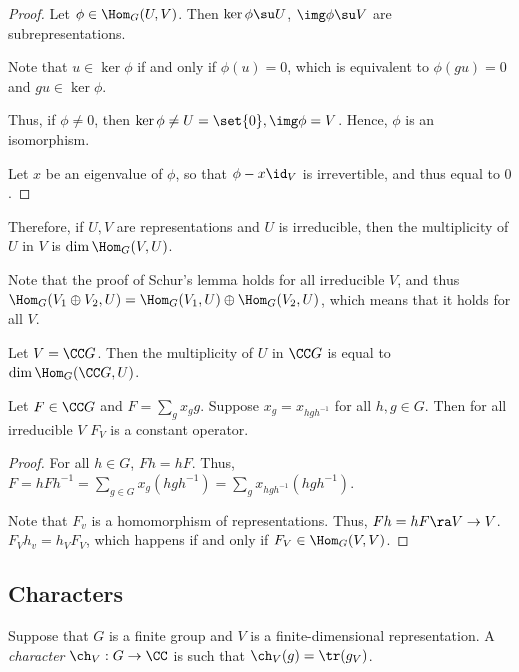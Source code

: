 \documentclass[11pt]{scrartcl}
\begin{document}
  \begin{proof}
    \hfill

    Let $\phi \in \Hom_{G}(U, V)$. Then $\ker \phi \su U$,
    $\img \phi \su V$ are subrepresentations.

    Note that $u\in\ker \phi$ if and only if $\phi(u) = 0$, which is
    equivalent to $\phi(gu) = 0$ and $gu \in \ker \phi$.

    Thus, if $\phi\neq 0$, then
    $\ker \phi \neq U = \set{0}, \img \phi = V $. Hence, $\phi$ is an
    isomorphism.

    Let $x$ be an eigenvalue of $\phi$, so that $\phi - x \id_{V}$ is
    irrevertible, and thus equal to $0$.
  \end{proof}

  Therefore, if $U, V$ are representations and $U$ is irreducible,
  then the multiplicity of $U$ in $V$ is $\dim \Hom_{G}(V, U)$.

  Note that the proof of Schur's lemma holds for all irreducible $V$,
  and thus
  $\Hom_{G}(V_{1}\oplus V_{2}, U) = \Hom_{G}(V_{1}, U) \oplus
  \Hom_{G}(V_{2}, U)$, which means that it holds for all $V$.

  \begin{example}

    Let $V = \CC G$. Then the multiplicity of $U$ in $\CC G$ is equal
    to $\dim \Hom_{G}(\CC G, U)$.
  \end{example}

  Let $F \in \CC G$ and $F = \sum_{g} x_{g} g$. Suppose
  $x_{g} = x_{hgh^{-1}}$ for all $h, g \in G$. Then for all
  irreducible $V$ $F_{V}$ is a constant operator.

  \begin{proof}
    \hfill

    For all $h\in G$, $Fh = hF$. Thus,
    $F = hFh^{-1} = \sum_{g\in G}x_{g}(hgh^{-1}) = \sum_{g}
    x_{hgh^{-1}}(hgh^{-1})$.

    Note that $F_{v}$ is a homomorphism of representations. Thus,
    $Fh = hF \ra V\to V$. $F_{V}h_{v} = h_{V}F_{V}$, which happens if
    and only if $F_{V} \in \Hom_{G}(V, V)$.
  \end{proof}

  \subsection{Characters}

  Suppose that $G$ is a finite group and $V$ is a finite-dimensional
  representation. A \textit{character} $\ch_{V}: G \to \CC$ is such that
  $\ch_{V}(g) = \tr(g_{V})$.
\end{document}
